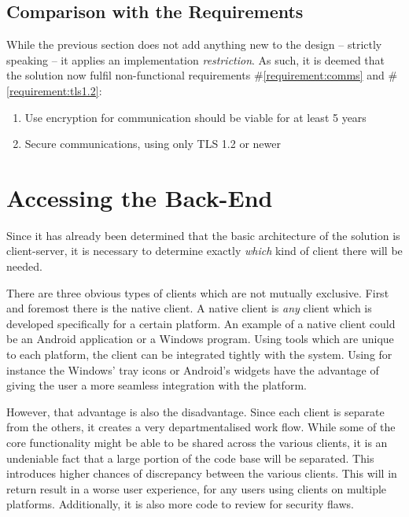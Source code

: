 		\subsection{Comparison with the Requirements}
			\label{requirement:fulfilled:comms}
			\label{requirement:fulfilled:tls1.2}
			While the previous section does not add anything new to the design -- strictly speaking -- it applies an implementation \emph{restriction}. As such, it is deemed that the solution now fulfil non-functional requirements \#\ref{requirement:comms} and \#\ref{requirement:tls1.2}:
			\vspace{-3ex}\begin{enumerate}
				\setlength\itemsep{0.1em}
				\setcounter{enumi}{5-1}
				\item Use encryption for communication should be viable for at least 5 years
				\item Secure communications, using only TLS 1.2 or newer 
			\end{enumerate}

	\section{Accessing the Back-End}
		\label{sec:design:frontend}
		Since it has already been determined that the basic architecture of the solution is client-server, it is necessary to determine exactly \emph{which} kind of client there will be needed. 

		There are three obvious types of clients which are not mutually exclusive. First and foremost there is the native client. A native client is \emph{any} client which is developed specifically for a certain platform. An example of a native client could be an Android application or a Windows program. Using tools which are unique to each platform, the client can be integrated tightly with the system. Using for instance the Windows' tray icons or Android's widgets have the advantage of giving the user a more seamless integration with the platform. 

		However, that advantage is also the disadvantage. Since each client is separate from the others, it creates a very departmentalised work flow. While some of the core functionality might be able to be shared across the various clients, it is an undeniable fact that a large portion of the code base will be separated. This introduces higher chances of discrepancy between the various clients. This will in return result in a worse user experience, for any users using clients on multiple platforms. Additionally, it is also more code to review for security flaws.

